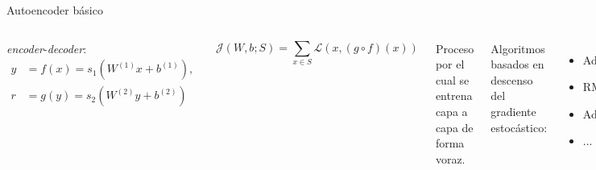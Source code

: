 \begin{frame}{Autoencoder básico}
\begin{columns}[t]

\emph{encoder}-\emph{decoder}:
\begin{align*}
  y&=f(x)=s_1(W^{(1)}x+b^{(1)}),\\
  r&=g(y)=s_2(W^{(2)}y+b^{(2)})
\end{align*}

\vspace{.1cm}
\vspace{-.5cm}
\begin{equation*}
\mathcal J(W,b;S)= \sum_{x \in S} \mathcal L(x, (g\circ f)(x))
\end{equation*}


\vspace{.1cm}

Proceso por el cual se entrena \alert{capa a capa} de forma voraz. 


Algoritmos basados en descenso del gradiente estocástico:
\begin{itemize}
\item AdaGrad
\item RMSProp
\item Adam
\item ...
\end{itemize}

Cómputo de gradientes mediante \emph{backpropagation}.


\end{columns}
\end{frame}

